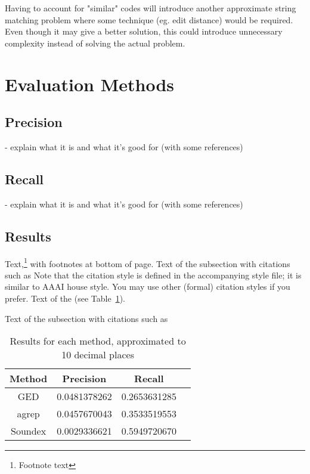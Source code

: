 \documentclass[11pt]{article}
\begin{document}
Having to account for "similar" codes will introduce another approximate string matching problem where some technique (eg. edit distance) would be required. Even though it may give a better solution, this could introduce unnecessary complexity instead of solving the actual problem. %

\section{Evaluation Methods}

\subsection{Precision}

- explain what it is and what it's good for (with some references)

\subsection{Recall}

- explain what it is and what it's good for (with some references)

\subsection{Results}

Text,\footnote{Footnote text} with footnotes at bottom of page.
Text of the subsection with citations such as 
Note that the citation style is defined in the accompanying
style file; it is similar to AAAI house style. You may use
other (formal) citation styles if you prefer.
Text of the (see Table~\ref{table1}).

Text of the subsection with citations such as 
\begin{table}[h]
 \begin{center}
\begin{tabular}{|c||c|c|c|}

\hline
Method & Precision & Recall \\
\hline\hline
GED & 0.0481378262 & 0.2653631285 \\ 
agrep & 0.0457670043 & 0.3533519553 \\ 
Soundex & 0.0029336621 & 0.5949720670 \\
\hline

\end{tabular}
\caption{Results for each method, approximated to 10 decimal places}\label{table1}
 \end{center}
\end{table}
\end{document}
